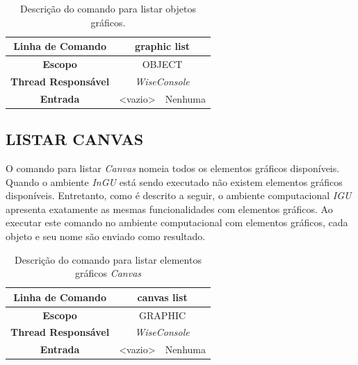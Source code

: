 \begin{center}
	\begin{table}[!htbp]
		\begin{tabularx}{\textwidth}{c|c|X}
			\toprule
			\textbf{Linha de Comando} & \multicolumn{2}{c}{graphic list} \\
			\midrule
			\textbf{Escopo} & \multicolumn{2}{c}{OBJECT} \\
			\hline
			\textbf{Thread Responsável} & \multicolumn{2}{c}{\textit{WiseConsole}} \\
			\hline
			\textbf{Entrada} & <vazio> & Nenhuma \\
			\bottomrule
		\end{tabularx}
		\caption{Descrição do comando para listar objetos gráficos.}
		\label{tab:graphic_list}
	\end{table}
\end{center}

\subsection{LISTAR CANVAS}\label{sec:canvas_list}

O comando para listar \textit{Canvas} nomeia todos os elementos gráficos disponíveis. Quando o ambiente \textit{InGU} está sendo executado não existem elementos gráficos disponíveis. Entretanto, como é descrito a seguir, o ambiente computacional \textit{IGU} apresenta exatamente as mesmas funcionalidades com elementos gráficos. Ao executar este comando no ambiente computacional com elementos gráficos, cada objeto e seu nome são enviado como resultado.

\begin{center}
	\begin{table}[!htbp]
		\begin{tabularx}{\textwidth}{c|c|X}
			\toprule
			\textbf{Linha de Comando} & \multicolumn{2}{c}{canvas list} \\
			\midrule
			\textbf{Escopo} & \multicolumn{2}{c}{GRAPHIC} \\
			\hline
			\textbf{Thread Responsável} & \multicolumn{2}{c}{\textit{WiseConsole}} \\
			\hline
			\textbf{Entrada} & <vazio> & Nenhuma \\
			\bottomrule
		\end{tabularx}
		\caption{Descrição do comando para listar elementos gráficos \textit{Canvas}}
		\label{tab:canvas_list}
	\end{table}
\end{center}


